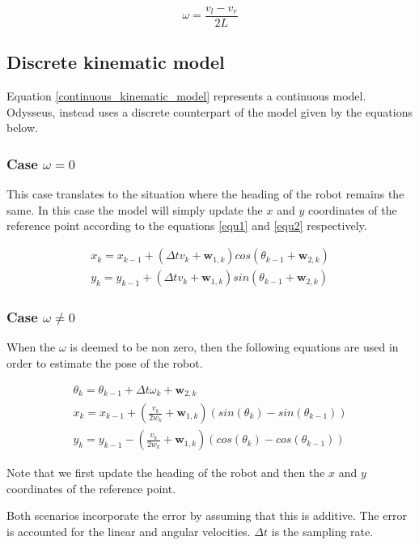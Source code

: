 \begin{equation}
\omega = \frac{v_l - v_r}{2L}
\label{odysseus_angular_velocity}
\end{equation}

\subsection{Discrete kinematic model}
\label{discrete_kinematic model}
Equation \ref{continuous_kinematic_model} represents a continuous model. Odysseus, instead uses a discrete
counterpart of the model given by the equations below. 

\subsubsection{Case $\omega=0$}
This case translates to the situation where the heading of the robot remains the same.
In this case the model will simply update the $x$ and $y$ coordinates of the reference point 
according to the equations \ref{equ1} and \ref{equ2} respectively.

\begin{eqnarray}
x_k = x_{k-1} + (\Delta t v_k + \mathbf{w}_{1,k})cos(\theta_{k-1} + \mathbf{w}_{2,k}) \label{equ1} \\
y_k = y_{k-1} + (\Delta t v_k + \mathbf{w}_{1,k})sin(\theta_{k-1} + \mathbf{w}_{2,k}) \label{equ2}
\end{eqnarray} 

\subsubsection{Case $\omega \neq 0$}
When the $\omega$ is deemed to be non zero, then the following equations are used
in order to estimate the pose of the robot.

\begin{eqnarray}
\theta_k = \theta_{k -1} + \Delta t \omega_k + \mathbf{w}_{2,k} \\
\label{equ3}
x_k = x_{k-1} + (\frac{v_k}{2w_k} + \mathbf{w}_{1,k})(sin(\theta_k) - sin(\theta_{k-1})) \label{equ4} \\
y_k = y_{k-1} - (\frac{v_k}{2w_k} + \mathbf{w}_{1,k})(cos(\theta_{k}) - cos(\theta_{k-1})) \label{equ5}
\end{eqnarray}

Note that we first update the heading of the robot and then the $x$ and $y$ coordinates
of the reference point.

Both scenarios incorporate the error by assuming that this is additive. The error is accounted for
the linear and angular velocities. $\Delta t$ is the sampling rate. 